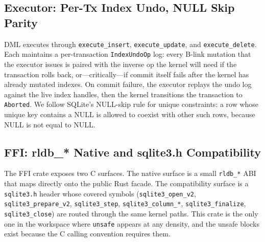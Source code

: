\subsection{Executor: Per-Tx Index Undo, NULL Skip Parity}
DML executes through \texttt{execute\_insert}, \texttt{execute\_update},
and \texttt{execute\_delete}. Each maintains a per-transaction
\texttt{IndexUndoOp} log: every B-link mutation that the executor
issues is paired with the inverse op the kernel will need if the
transaction rolls back, or---critically---if commit itself fails after
the kernel has already mutated indexes. On commit failure, the
executor replays the undo log against the live index handles, then
the kernel transitions the transaction to \texttt{Aborted}. We follow
SQLite's NULL-skip rule for unique constraints: a row whose unique
key contains a NULL is allowed to coexist with other such rows,
because NULL is not equal to NULL.

\subsection{FFI: rldb\_* Native and sqlite3.h Compatibility}
The FFI crate exposes two C surfaces. The native surface is a small
\texttt{rldb\_*} ABI that maps directly onto the public Rust facade.
The compatibility surface is a \texttt{sqlite3.h} header whose
covered symbols (\texttt{sqlite3\_open\_v2}, \texttt{sqlite3\_prepare\_v2},
\texttt{sqlite3\_step}, \texttt{sqlite3\_column\_*}, \texttt{sqlite3\_finalize},
\texttt{sqlite3\_close}) are routed through the same kernel paths.
This crate is the only one in the workspace where \texttt{unsafe}
appears at any density, and the unsafe blocks exist because the C
calling convention requires them.
